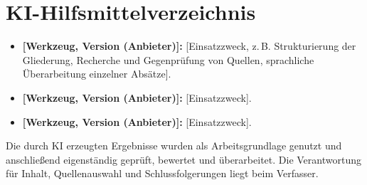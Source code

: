 %
\section*{KI-Hilfsmittelverzeichnis}

\begin{itemize}
  \item \textbf{[Werkzeug, Version (Anbieter)]:} [Einsatzzweck, z.\,B.
        Strukturierung der Gliederung, Recherche und Gegenprüfung von Quellen,
        sprachliche Überarbeitung einzelner Absätze].
  \item \textbf{[Werkzeug, Version (Anbieter)]:} [Einsatzzweck].
  \item \textbf{[Werkzeug, Version (Anbieter)]:} [Einsatzzweck].
\end{itemize}

Die durch KI erzeugten Ergebnisse wurden als Arbeitsgrundlage genutzt und
anschließend eigenständig geprüft, bewertet und überarbeitet. Die Verantwortung
für Inhalt, Quellenauswahl und Schlussfolgerungen liegt beim Verfasser.

